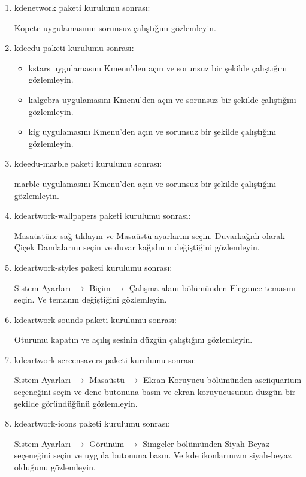 \documentclass[a4paper,10pt]{article}
\begin{document}
\begin{enumerate}
\item kdenetwork paketi kurulumu sonrası: 

Kopete uygulamasının sorunsuz çalıştığını gözlemleyin.

\item kdeedu paketi kurulumu sonrası: 
\begin{itemize}
 \item kstars uygulamasını Kmenu'den açın ve sorunsuz bir şekilde çalıştığını gözlemleyin. 
 \item kalgebra uygulamasını Kmenu'den açın ve sorunsuz bir şekilde çalıştığını gözlemleyin. 
 \item kig uygulamasını Kmenu'den açın ve sorunsuz bir şekilde çalıştığını gözlemleyin. 
\end{itemize}

\item kdeedu-marble paketi kurulumu sonrası: 

marble uygulamasını Kmenu'den açın ve sorunsuz bir şekilde çalıştığını gözlemleyin. 
\item kdeartwork-wallpapers paketi kurulumu sonrası: 

Masaüstüne sağ tıklayın ve Masaüstü ayarlarını seçin. Duvarkağıdı olarak Çiçek Damlalarını seçin ve duvar kağıdının değiştiğini gözlemleyin.

\item kdeartwork-styles paketi kurulumu sonrası: 

Sistem Ayarları $\rightarrow$ Biçim $\rightarrow$ Çalışma alanı bölümünden Elegance temasını seçin. Ve temanın değiştiğini gözlemleyin.

\item kdeartwork-sounds paketi kurulumu sonrası:

Oturumu kapatın ve açılış sesinin düzgün çalıştığını gözlemleyin.

\item kdeartwork-screensavers paketi kurulumu sonrası:

Sistem Ayarları $\rightarrow$ Masaüstü $\rightarrow$ Ekran Koruyucu bölümünden asciiquarium seçeneğini seçin ve dene butonuna basın ve ekran koruyucusunun düzgün bir şekilde göründüğünü gözlemleyin.

\item kdeartwork-icons paketi kurulumu sonrası:

Sistem Ayarları $\rightarrow$ Görünüm $\rightarrow$ Simgeler bölümünden Siyah-Beyaz seçeneğini seçin ve uygula butonuna basın. Ve kde ikonlarınızın siyah-beyaz olduğunu gözlemleyin.


\end{enumerate}
\end{document}
